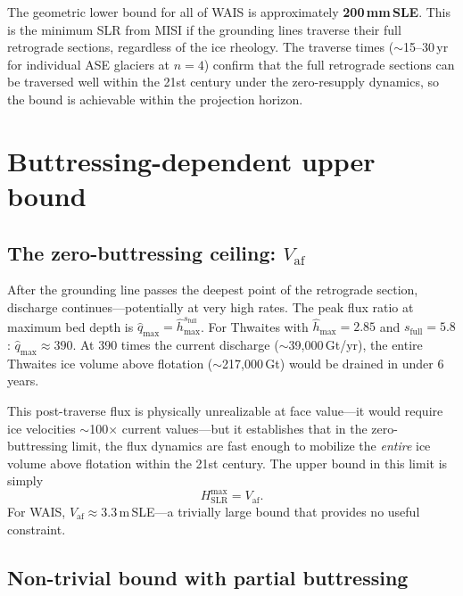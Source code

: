 \documentclass[11pt]{article}
\newcommand{\hhat}{\hat{h}}
\newcommand{\Vaf}{V_{\mathrm{af}}}
\begin{document}
The geometric lower bound for all of WAIS is approximately \textbf{200\,mm\,SLE}. This is the minimum SLR from MISI if the grounding lines traverse their full retrograde sections, regardless of the ice rheology. The traverse times ($\sim$15--30\,yr for individual ASE glaciers at $n = 4$) confirm that the full retrograde sections can be traversed well within the 21st century under the zero-resupply dynamics, so the bound is achievable within the projection horizon.


\section{Buttressing-dependent upper bound}
\label{sec:upper_bound}

\subsection{The zero-buttressing ceiling: $\Vaf$}

After the grounding line passes the deepest point of the retrograde section, discharge continues---potentially at very high rates. The peak flux ratio at maximum bed depth is $\hat{q}_{\max} = \hhat_{\max}^{s_{\mathrm{full}}}$. For Thwaites with $\hhat_{\max} = 2.85$ and $s_{\mathrm{full}} = 5.8$: $\hat{q}_{\max} \approx 390$. At 390 times the current discharge ($\sim$39{,}000\,Gt/yr), the entire Thwaites ice volume above flotation ($\sim$217{,}000\,Gt) would be drained in under 6 years.

This post-traverse flux is physically unrealizable at face value---it would require ice velocities $\sim$100$\times$ current values---but it establishes that in the zero-buttressing limit, the flux dynamics are fast enough to mobilize the \emph{entire} ice volume above flotation within the 21st century. The upper bound in this limit is simply
\begin{equation}
	H_{\mathrm{SLR}}^{\mathrm{max}} = \Vaf.
	\label{eq:Vaf_ceiling}
\end{equation}
For WAIS, $\Vaf \approx 3.3$\,m\,SLE---a trivially large bound that provides no useful constraint.

\subsection{Non-trivial bound with partial buttressing}
\end{document}
